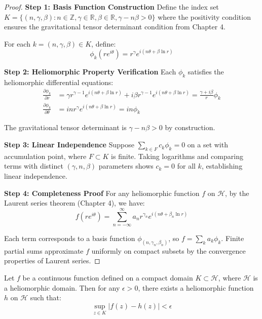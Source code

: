 \begin{proof}
\textbf{Step 1: Basis Function Construction}
Define the index set $K = \{(n, \gamma, \beta) : n \in \mathbb{Z}, \gamma \in \mathbb{R}, \beta \in \mathbb{R}, \gamma - n\beta > 0\}$ where the positivity condition ensures the gravitational tensor determinant condition from Chapter 4.

For each $k = (n, \gamma, \beta) \in K$, define:
$$\phi_k(re^{i\theta}) = r^\gamma e^{i(n\theta + \beta \ln r)}$$

\textbf{Step 2: Heliomorphic Property Verification}
Each $\phi_k$ satisfies the heliomorphic differential equations:
\begin{align}
\frac{\partial \phi_k}{\partial r} &= \gamma r^{\gamma-1} e^{i(n\theta + \beta \ln r)} + i\beta r^{\gamma-1} e^{i(n\theta + \beta \ln r)} = \frac{\gamma + i\beta}{r}\phi_k\\
\frac{\partial \phi_k}{\partial \theta} &= in r^\gamma e^{i(n\theta + \beta \ln r)} = in\phi_k
\end{align}

The gravitational tensor determinant is $\gamma - n\beta > 0$ by construction.

\textbf{Step 3: Linear Independence}
Suppose $\sum_{k \in F} c_k \phi_k = 0$ on a set with accumulation point, where $F \subset K$ is finite. Taking logarithms and comparing terms with distinct $(\gamma, n, \beta)$ parameters shows $c_k = 0$ for all $k$, establishing linear independence.

\textbf{Step 4: Completeness Proof}
For any heliomorphic function $f$ on $\mathcal{H}$, by the Laurent series theorem (Chapter 4), we have:
$$f(re^{i\theta}) = \sum_{n=-\infty}^{\infty} a_n r^{\gamma_n} e^{i(n\theta + \beta_n \ln r)}$$

Each term corresponds to a basis function $\phi_{(n,\gamma_n,\beta_n)}$, so $f = \sum_{k} a_k \phi_k$. Finite partial sums approximate $f$ uniformly on compact subsets by the convergence properties of Laurent series.
\end{proof}

\begin{lemma}
Let $f$ be a continuous function defined on a compact domain $K \subset \mathcal{H}$, where $\mathcal{H}$ is a heliomorphic domain. Then for any $\epsilon > 0$, there exists a heliomorphic function $h$ on $\mathcal{H}$ such that:
\begin{equation}
\sup_{z \in K} |f(z) - h(z)| < \epsilon
\end{equation}
\end{lemma}

